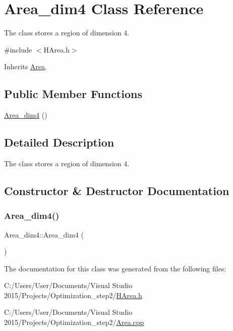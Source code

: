 \hypertarget{class_area__dim4}{}\section{Area\+\_\+dim4 Class Reference}
\label{class_area__dim4}


The class stores a region of dimension 4.  




{\ttfamily \#include $<$H\+Area.\+h$>$}



Inherits \hyperlink{class_area}{Area}.

\subsection*{Public Member Functions}
\begin{DoxyCompactItemize}
\item 
\hyperlink{class_area__dim4_a43f306edc920e66cc1d950eedf45b530}{Area\+\_\+dim4} ()
\end{DoxyCompactItemize}


\subsection{Detailed Description}
The class stores a region of dimension 4. 

\subsection{Constructor \& Destructor Documentation}
\mbox{\label{class_area__dim4_a43f306edc920e66cc1d950eedf45b530}} 
\subsubsection{\texorpdfstring{Area\+\_\+dim4()}{Area\_dim4()}}
{\footnotesize\ttfamily Area\+\_\+dim4\+::\+Area\+\_\+dim4 (\begin{DoxyParamCaption}{ }\end{DoxyParamCaption})}



The documentation for this class was generated from the following files\+:\begin{DoxyCompactItemize}
\item 
C\+:/\+Users/\+User/\+Documents/\+Visual Studio 2015/\+Projects/\+Optimization\+\_\+step2/\hyperlink{_h_area_8h}{H\+Area.\+h}\item 
C\+:/\+Users/\+User/\+Documents/\+Visual Studio 2015/\+Projects/\+Optimization\+\_\+step2/\hyperlink{_area_8cpp}{Area.\+cpp}\end{DoxyCompactItemize}
